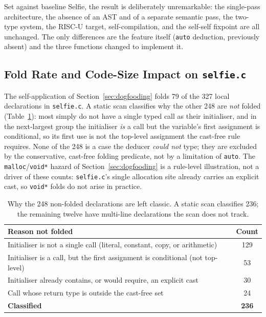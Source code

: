 \documentclass[a4paper,11pt]{article}
\begin{document}
Set against baseline Selfie, the result is deliberately unremarkable: the single-pass architecture, the absence of an AST and of a separate semantic pass, the two-type system, the RISC-U target, self-compilation, and the self-self fixpoint are all unchanged. The only differences are the feature itself (\texttt{auto} deduction, previously absent) and the three functions changed to implement it.

\subsection{Fold Rate and Code-Size Impact on \texttt{selfie.c}}
\label{sec:foldrate}

The self-application of Section~\ref{sec:dogfooding} folds 79 of the 327 local declarations in \texttt{selfie.c}. A static scan classifies why the other 248 are \emph{not} folded (Table~\ref{tab:foldrate}): most simply do not have a single typed call as their initialiser, and in the next-largest group the initialiser \emph{is} a call but the variable's first assignment is conditional, so its first use is not the top-level assignment the cast-free rule requires. None of the 248 is a case the deducer \emph{could not} type; they are excluded by the conservative, cast-free folding predicate, not by a limitation of \texttt{auto}. The \texttt{malloc}/\texttt{void*} hazard of Section~\ref{sec:dogfooding} is a rule-level illustration, not a driver of these counts: \texttt{selfie.c}'s single allocation site already carries an explicit cast, so \texttt{void*} folds do not arise in practice.

\begin{table}[ht]
\centering
\caption{Why the 248 non-folded declarations are left classic. A static scan classifies 236; the remaining twelve have multi-line declarations the scan does not track.}
\label{tab:foldrate}
\small
\begin{tabular}{lc}
\toprule
\textbf{Reason not folded} & \textbf{Count} \\
\midrule
Initialiser is not a single call (literal, constant, copy, or arithmetic) & 129 \\
Initialiser is a call, but the first assignment is conditional (not top-level) & 53 \\
Initialiser already contains, or would require, an explicit cast & 30 \\
Call whose return type is outside the cast-free set & 24 \\
\midrule
\textbf{Classified} & \textbf{236} \\
\bottomrule
\end{tabular}
\end{table}
\end{document}
